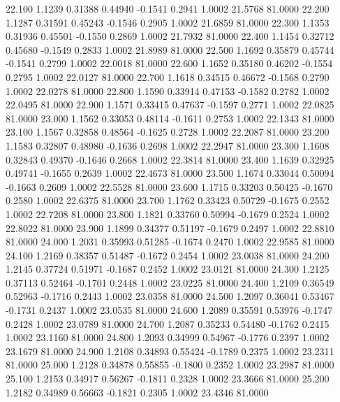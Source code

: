   22.100   1.1239   0.31388   0.44940  -0.1541   0.2941   1.0002  21.5768  81.0000
  22.200   1.1287   0.31591   0.45243  -0.1546   0.2905   1.0002  21.6859  81.0000
  22.300   1.1353   0.31936   0.45501  -0.1550   0.2869   1.0002  21.7932  81.0000
  22.400   1.1454   0.32712   0.45680  -0.1549   0.2833   1.0002  21.8989  81.0000
  22.500   1.1692   0.35879   0.45744  -0.1541   0.2799   1.0002  22.0018  81.0000
  22.600   1.1652   0.35180   0.46202  -0.1554   0.2795   1.0002  22.0127  81.0000
  22.700   1.1618   0.34515   0.46672  -0.1568   0.2790   1.0002  22.0278  81.0000
  22.800   1.1590   0.33914   0.47153  -0.1582   0.2782   1.0002  22.0495  81.0000
  22.900   1.1571   0.33415   0.47637  -0.1597   0.2771   1.0002  22.0825  81.0000
  23.000   1.1562   0.33053   0.48114  -0.1611   0.2753   1.0002  22.1343  81.0000
  23.100   1.1567   0.32858   0.48564  -0.1625   0.2728   1.0002  22.2087  81.0000
  23.200   1.1583   0.32807   0.48980  -0.1636   0.2698   1.0002  22.2947  81.0000
  23.300   1.1608   0.32843   0.49370  -0.1646   0.2668   1.0002  22.3814  81.0000
  23.400   1.1639   0.32925   0.49741  -0.1655   0.2639   1.0002  22.4673  81.0000
  23.500   1.1674   0.33044   0.50094  -0.1663   0.2609   1.0002  22.5528  81.0000
  23.600   1.1715   0.33203   0.50425  -0.1670   0.2580   1.0002  22.6375  81.0000
  23.700   1.1762   0.33423   0.50729  -0.1675   0.2552   1.0002  22.7208  81.0000
  23.800   1.1821   0.33760   0.50994  -0.1679   0.2524   1.0002  22.8022  81.0000
  23.900   1.1899   0.34377   0.51197  -0.1679   0.2497   1.0002  22.8810  81.0000
  24.000   1.2031   0.35993   0.51285  -0.1674   0.2470   1.0002  22.9585  81.0000
  24.100   1.2169   0.38357   0.51487  -0.1672   0.2454   1.0002  23.0038  81.0000
  24.200   1.2145   0.37724   0.51971  -0.1687   0.2452   1.0002  23.0121  81.0000
  24.300   1.2125   0.37113   0.52464  -0.1701   0.2448   1.0002  23.0225  81.0000
  24.400   1.2109   0.36549   0.52963  -0.1716   0.2443   1.0002  23.0358  81.0000
  24.500   1.2097   0.36041   0.53467  -0.1731   0.2437   1.0002  23.0535  81.0000
  24.600   1.2089   0.35591   0.53976  -0.1747   0.2428   1.0002  23.0789  81.0000
  24.700   1.2087   0.35233   0.54480  -0.1762   0.2415   1.0002  23.1160  81.0000
  24.800   1.2093   0.34999   0.54967  -0.1776   0.2397   1.0002  23.1679  81.0000
  24.900   1.2108   0.34893   0.55424  -0.1789   0.2375   1.0002  23.2311  81.0000
  25.000   1.2128   0.34878   0.55855  -0.1800   0.2352   1.0002  23.2987  81.0000
  25.100   1.2153   0.34917   0.56267  -0.1811   0.2328   1.0002  23.3666  81.0000
  25.200   1.2182   0.34989   0.56663  -0.1821   0.2305   1.0002  23.4346  81.0000
